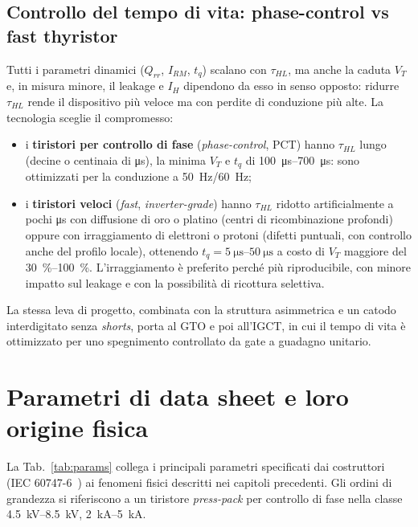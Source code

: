 \documentclass[11pt,a4paper]{article}
\newcommand{\IH}{\ensuremath{I_H}}
\newcommand{\tq}{\ensuremath{t_q}}
\newcommand{\en}[1]{\emph{#1}}   %
\begin{document}
\subsection{Controllo del tempo di vita: phase-control vs fast thyristor}
\label{sec:lifetime}
Tutti i parametri dinamici ($Q_{rr}$, $I_{RM}$, $\tq$) scalano con $\tau_{HL}$, ma anche la caduta $V_T$ e, in misura minore, il leakage e $\IH$ dipendono da esso in senso opposto: ridurre $\tau_{HL}$ rende il dispositivo più veloce ma con perdite di conduzione più alte. La tecnologia sceglie il compromesso:
\begin{itemize}
  \item i \textbf{tiristori per controllo di fase} (\en{phase-control}, PCT) hanno $\tau_{HL}$ lungo (decine o centinaia di \unit{\us}), la minima $V_T$ e $\tq$ di \qtyrange{100}{700}{\us}: sono ottimizzati per la conduzione a \qty{50}{\Hz}/\qty{60}{\Hz};
  \item i \textbf{tiristori veloci} (\en{fast}, \en{inverter-grade}) hanno $\tau_{HL}$ ridotto artificialmente a pochi \unit{\us} con diffusione di oro o platino (centri di ricombinazione profondi) oppure con irraggiamento di elettroni o protoni (difetti puntuali, con controllo anche del profilo locale), ottenendo $\tq=\qtyrange{5}{50}{\us}$ a costo di $V_T$ maggiore del \qtyrange{30}{100}{\percent}. L'irraggiamento è preferito perché più riproducibile, con minore impatto sul leakage e con la possibilità di ricottura selettiva.
\end{itemize}
La stessa leva di progetto, combinata con la struttura asimmetrica e un catodo interdigitato senza \en{shorts}, porta al GTO e poi all'IGCT, in cui il tempo di vita è ottimizzato per uno spegnimento controllato da gate a guadagno unitario.

\section{Parametri di data sheet e loro origine fisica}
La Tab.~\ref{tab:params} collega i principali parametri specificati dai costruttori (IEC 60747-6~\cite{iec60747}) ai fenomeni fisici descritti nei capitoli precedenti. Gli ordini di grandezza si riferiscono a un tiristore \en{press-pack} per controllo di fase nella classe \qtyrange{4.5}{8.5}{\kV}, \qtyrange{2}{5}{\kA}.
\end{document}
